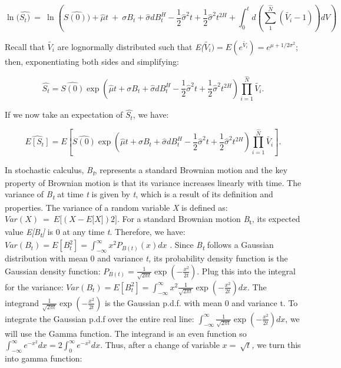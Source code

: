 \documentclass[12pt,a4paper]{report}
\numberwithin{equation}{section}
\begin{document}
\[\ln(\widehat{S_{t})}\  = \ \ln(\widehat{S(0))} + \widehat{\mu}t\  + \ \sigma B_{t} + \widehat{\sigma}dB_{t}^{H} - \frac{1}{2}{\widehat{\sigma}}^{2}t + \frac{1}{2}{\widehat{\sigma}}^{2}t^{2H} + \int_{0}^{t}{d\left( \sum_{1}^{\widehat{N}}\left( \widetilde{V_{i}} - 1 \right) \right)}dV)\]

Recall that \(\widetilde{V_{i}}\) are lognormally distributed such that
\emph{E(}\(\widetilde{V_{i}}) = E\left( e^{\widetilde{V_{i}}} \right) = e^{\mu + 1/2\sigma^{2}}\);
then, exponentiating both sides and simplifying:

\[
\widehat{S_{t}}
= \widehat{S(0)}\exp\!\left(\widehat{\mu}t + \sigma B_{t} + \widehat{\sigma}dB_{t}^{H}
- \frac{1}{2}\widehat{\sigma}^{2}t + \frac{1}{2}\widehat{\sigma}^{2}t^{2H}\right)
\prod_{i=1}^{\widehat{N}}\widetilde{V_{i}}.
\]


If we now take an expectation of \(\widehat{S_{t}}\), we have:

\[
\widehat{E\!\left[S_t\right]}
= E\!\left[\widehat{S(0)}\exp\!\left(\widehat{\mu}t + \sigma B_{t} + \widehat{\sigma}dB_{t}^{H}
- \frac{1}{2}\widehat{\sigma}^{2}t + \frac{1}{2}\widehat{\sigma}^{2}t^{2H}\right)
\prod_{i=1}^{\widehat{N}}\widetilde{V_{i}}\right].
\]


In stochastic calculus, \emph{B\textsubscript{t}}, represents a standard
Brownian motion and the key property of Brownian motion is that its
variance increases linearly with time. The variance of
\emph{B\textsubscript{t}} at time \emph{t} is given by \emph{t}, which
is a result of its definition and properties. The variance of a random
variable \emph{X} is defined as:
\(Var(X)\  = \ E\lbrack(X - E\lbrack X\rbrack)2\rbrack.\) For a standard
Brownian motion \emph{B}\textsubscript{t}, its expected value
\emph{E{[}B\textsubscript{t}{]}} is 0 at any time \emph{t}. Therefore,
we have:
\(Var\left( B_{t} \right) = E\left\lbrack B_{t}^{2} \right\rbrack = \int_{- \infty}^{\infty}{x^{2}P_{B(t)}(x)dx}\)
. Since \emph{B\textsubscript{t}} follows a Gaussian distribution with
mean 0 and variance \emph{t,} its probability density function is the
Gaussian density function:
\(P_{B(t)} = \frac{1}{\sqrt{2\pi t}}\exp( - \frac{x^{2}}{2t})\). Plug
this into the integral for the variance:
\(Var\left( B_{t} \right) = E\left\lbrack B_{t}^{2} \right\rbrack = \int_{- \infty}^{\infty}{x^{2}\frac{1}{\sqrt{2\pi t}}\exp( - \frac{x^{2}}{2t})dx}\).
The integrand \(\frac{1}{\sqrt{2\pi t}}\exp( - \frac{x^{2}}{2t})\) is the
Gaussian p.d.f. with mean 0 and variance t. To integrate the Gaussian
p.d.f over the entire real line:
\(\int_{- \infty}^{\infty}{\frac{1}{\sqrt{2\pi t}}\exp( - \frac{x^{2}}{2t})dx}\),
we will use the Gamma function. The integrand is an even function so
\(\int_{- \infty}^{\infty}{e^{- x^{2}}dx = 2}\int_{0}^{\infty}{e^{- x^{2}}dx.}\)
Thus, after a change of variable \(x = \ \sqrt{t}\)\emph{,} we turn this
into gamma function:
\end{document}
